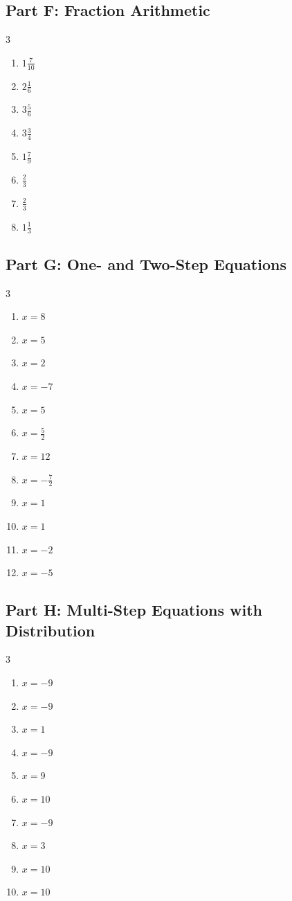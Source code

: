 \documentclass[11pt]{article}
\begin{document}
\subsection*{Part F: Fraction Arithmetic}
\begin{multicols}{3}
\begin{enumerate}
  \item $1\frac{7}{10}$
  \item $2\frac{1}{6}$
  \item $3\frac{5}{6}$
  \item $3\frac{3}{4}$
  \item $1\frac{7}{9}$
  \item $\frac{2}{3}$
  \item $\frac{2}{3}$
  \item $1\frac{1}{3}$
\end{enumerate}
\end{multicols}
\subsection*{Part G: One- and Two-Step Equations}
\begin{multicols}{3}
\begin{enumerate}
  \item $x = 8$
  \item $x = 5$
  \item $x = 2$
  \item $x = -7$
  \item $x = 5$
  \item $x = \frac{5}{2}$
  \item $x = 12$
  \item $x = - \frac{7}{2}$
  \item $x = 1$
  \item $x = 1$
  \item $x = -2$
  \item $x = -5$
\end{enumerate}
\end{multicols}
\subsection*{Part H: Multi-Step Equations with Distribution}
\begin{multicols}{3}
\begin{enumerate}
  \item $x = -9$
  \item $x = -9$
  \item $x = 1$
  \item $x = -9$
  \item $x = 9$
  \item $x = 10$
  \item $x = -9$
  \item $x = 3$
  \item $x = 10$
  \item $x = 10$
\end{enumerate}
\end{multicols}
\end{document}
